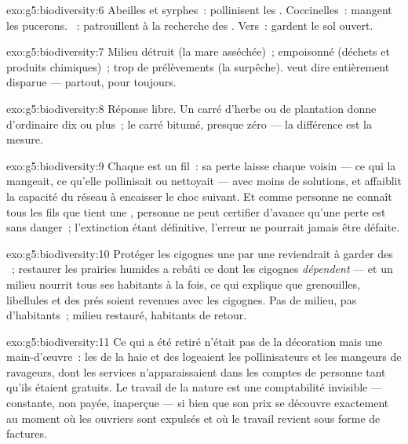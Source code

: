 \begin{solution}{exo:g5:biodiversity:6}
Abeilles et syrphes~: pollinisent les . Coccinelles~: mangent
les pucerons. ~: patrouillent à la recherche des .
Vers~: gardent le sol ouvert.
\end{solution}

\begin{solution}{exo:g5:biodiversity:7}
Milieu détruit (la mare asséchée)~;  empoisonné
(déchets et produits chimiques)~; trop de prélèvements (la
surpêche).  veut dire entièrement disparue --- partout, pour
toujours.
\end{solution}

\begin{solution}{exo:g5:biodiversity:8}
Réponse libre. Un carré d'herbe ou de plantation donne d'ordinaire
dix  ou plus~; le carré bitumé, presque zéro --- la
différence est la mesure.
\end{solution}

\begin{solution}{exo:g5:biodiversity:9}
Chaque  est un fil~: sa perte laisse chaque voisin --- ce qui
la mangeait, ce qu'elle pollinisait ou nettoyait --- avec moins de
solutions, et affaiblit la capacité du réseau à encaisser le choc
suivant. Et comme personne ne connaît tous les fils que tient une
, personne ne peut certifier d'avance qu'une perte est sans
danger~; l'extinction étant définitive, l'erreur ne pourrait jamais
être défaite.
\end{solution}

\begin{solution}{exo:g5:biodiversity:10}
Protéger les cigognes une par une reviendrait à garder des ~;
restaurer les prairies humides a rebâti ce dont les cigognes
\emph{dépendent} --- et un milieu nourrit tous ses habitants à la
fois, ce qui explique que grenouilles, libellules et  des prés
soient revenues avec les cigognes. Pas de milieu, pas d'habitants~;
milieu restauré, habitants de retour.
\end{solution}

\begin{solution}{exo:g5:biodiversity:11}
Ce qui a été retiré n'était pas de la décoration mais une
main-d'œuvre~: les  de la haie et des  logeaient les
pollinisateurs et les mangeurs de ravageurs, dont les services
n'apparaissaient dans les comptes de personne tant qu'ils étaient
gratuits. Le travail de la nature est une comptabilité invisible ---
constante, non payée, inaperçue --- si bien que son prix se
découvre exactement au moment où les ouvriers sont expulsés et où le
travail revient sous forme de factures.
\end{solution}
